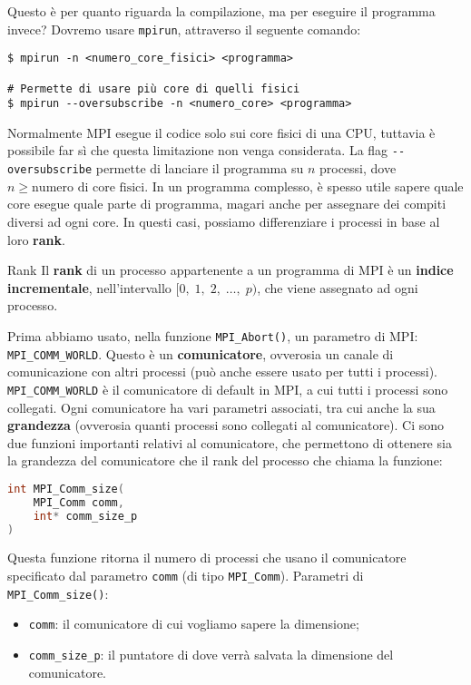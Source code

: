 Questo è per quanto riguarda la compilazione, ma per eseguire il programma invece? Dovremo usare \texttt{mpirun}, attraverso il seguente comando:
\begin{terminal}
    \begin{lstlisting}[style = notexterm]
$ mpirun -n <numero_core_fisici> <programma>

# Permette di usare più core di quelli fisici
$ mpirun --oversubscribe -n <numero_core> <programma>\end{lstlisting}
\end{terminal}

Normalmente MPI esegue il codice solo sui core fisici di una CPU, tuttavia è possibile far sì che questa limitazione non venga considerata. La flag \verb|--oversubscribe| permette di lanciare il programma su $n$ processi, dove $n \geq \text{numero di core fisici}$.
\nwl
In un programma complesso, è spesso utile sapere quale core esegue quale parte di programma, magari anche per assegnare dei compiti diversi ad ogni core. In questi casi, possiamo differenziare i processi in base al loro \textbf{rank}.

\begin{definition}{Rank}
    Il \textbf{rank} di un processo appartenente a un programma di MPI è un \textbf{indice incrementale}, nell'intervallo $[0, \; 1, \; 2, \; \dots , \; p)$, che viene assegnato ad ogni processo.
\end{definition}

Prima abbiamo usato, nella funzione \verb|MPI_Abort()|, un parametro di MPI: \verb|MPI_COMM_WORLD|. Questo è un \textbf{comunicatore}, ovverosia un canale di comunicazione con altri processi (può anche essere usato per tutti i processi). \verb|MPI_COMM_WORLD| è il comunicatore di default in MPI, a cui tutti i processi sono collegati. Ogni comunicatore ha vari parametri associati, tra cui anche la sua \textbf{grandezza} (ovverosia quanti processi sono collegati al comunicatore). Ci sono due funzioni importanti relativi al comunicatore, che permettono di ottenere sia la grandezza del comunicatore che il rank del processo che chiama la funzione:

\begin{codedefine}
    \begin{lstlisting}[language = C, numbers = none]
int MPI_Comm_size(
    MPI_Comm comm,
    int* comm_size_p
)\end{lstlisting}
    \manlower
    Questa funzione ritorna il numero di processi che usano il comunicatore specificato dal parametro \verb|comm| (di tipo \verb|MPI_Comm|).
    \nwl
    Parametri di \verb|MPI_Comm_size()|:
    \begin{itemize}
        \item \verb|comm|: il comunicatore di cui vogliamo sapere la dimensione;
        \item \verb|comm_size_p|: il puntatore di dove verrà salvata la dimensione del comunicatore.
    \end{itemize}
\end{codedefine}

